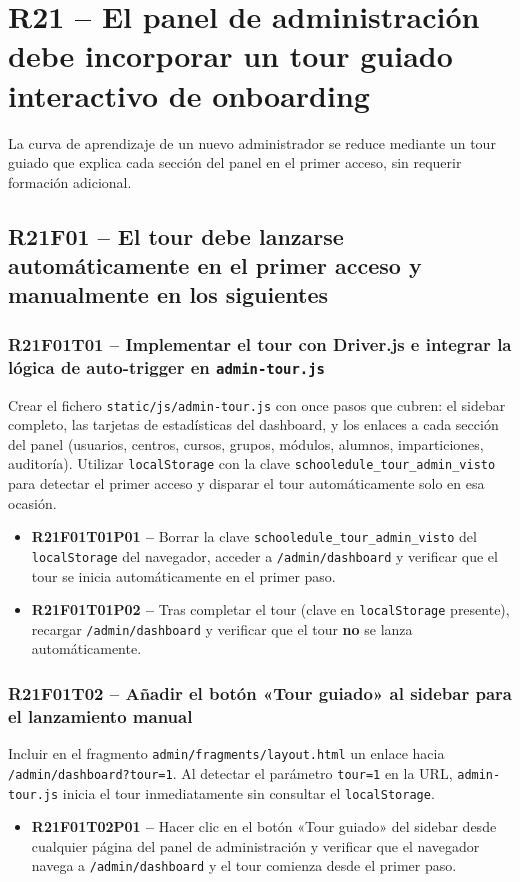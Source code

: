 \documentclass[12pt, a4paper]{report}
\begin{document}
\section{R21 -- El panel de administración debe incorporar un tour guiado interactivo de onboarding}

La curva de aprendizaje de un nuevo administrador se reduce mediante un tour guiado que explica cada sección del panel en el primer acceso, sin requerir formación adicional.

\subsection{R21F01 -- El tour debe lanzarse automáticamente en el primer acceso y manualmente en los siguientes}

\subsubsection{R21F01T01 -- Implementar el tour con Driver.js e integrar la lógica de auto-trigger en \texttt{admin-tour.js}}
Crear el fichero \texttt{static/js/admin-tour.js} con once pasos que cubren: el sidebar completo, las tarjetas de estadísticas del dashboard, y los enlaces a cada sección del panel (usuarios, centros, cursos, grupos, módulos, alumnos, imparticiones, auditoría). Utilizar \texttt{localStorage} con la clave \texttt{schooledule\_tour\_admin\_visto} para detectar el primer acceso y disparar el tour automáticamente solo en esa ocasión.
\begin{itemize}
  \item \textbf{R21F01T01P01 --} Borrar la clave \texttt{schooledule\_tour\_admin\_visto} del \texttt{localStorage} del navegador, acceder a \texttt{/admin/dashboard} y verificar que el tour se inicia automáticamente en el primer paso.
  \item \textbf{R21F01T01P02 --} Tras completar el tour (clave en \texttt{localStorage} presente), recargar \texttt{/admin/dashboard} y verificar que el tour \textbf{no} se lanza automáticamente.
\end{itemize}

\subsubsection{R21F01T02 -- Añadir el botón «Tour guiado» al sidebar para el lanzamiento manual}
Incluir en el fragmento \texttt{admin/fragments/layout.html} un enlace hacia \texttt{/admin/dashboard?tour=1}. Al detectar el parámetro \texttt{tour=1} en la URL, \texttt{admin-tour.js} inicia el tour inmediatamente sin consultar el \texttt{localStorage}.
\begin{itemize}
  \item \textbf{R21F01T02P01 --} Hacer clic en el botón «Tour guiado» del sidebar desde cualquier página del panel de administración y verificar que el navegador navega a \texttt{/admin/dashboard} y el tour comienza desde el primer paso.
\end{itemize}
\end{document}
